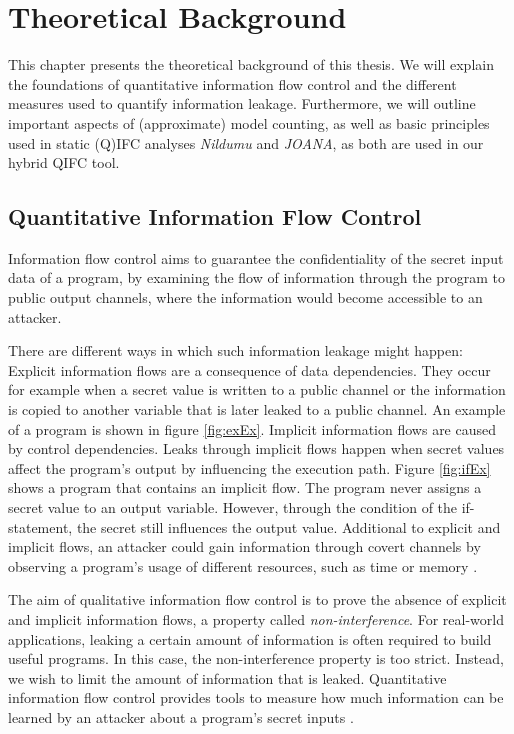 \chapter{Theoretical Background}\label{sec:basics}

This chapter presents the theoretical background of this thesis. We will explain the foundations of quantitative information flow control and the different measures used to quantify information leakage. Furthermore, we will outline important aspects of (approximate) model counting, as well as basic principles used in static (Q)IFC analyses \emph{Nildumu} and \emph{JOANA}, as both are used in our hybrid QIFC tool.

\section{Quantitative Information Flow Control}

Information flow control aims to guarantee the confidentiality of the secret input data of a program, by examining the flow of information through the program to public output channels, where the information would become accessible to an attacker.

There are different ways in which such information leakage might happen: Explicit information flows are a consequence of data dependencies. They occur for example when a secret value is written to a public channel or the information is copied to another variable that is later leaked to a public channel. An example of a program is shown in figure \ref{fig:exEx}. Implicit information flows are caused by control dependencies. Leaks through implicit flows happen when secret values affect the program's output by influencing the execution path. Figure \ref{fig:ifEx} shows a program that contains an implicit flow. The program never assigns a secret value to an output variable. However, through the condition of the if-statement, the secret still influences the output value. 
Additional to explicit and implicit flows, an attacker could gain information through covert channels by observing a program's usage of different resources, such as time or memory \cite{smith07}.

The aim of qualitative information flow control is to prove the absence of explicit and implicit information flows, a property called \emph{non-interference}. For real-world applications, leaking a certain amount of information is often required to build useful programs. In this case, the non-interference property is too strict. Instead, we wish to limit the amount of information that is leaked. Quantitative information flow control provides tools to measure how much information can be learned by an attacker about a program's secret inputs \cite{smith09}.

